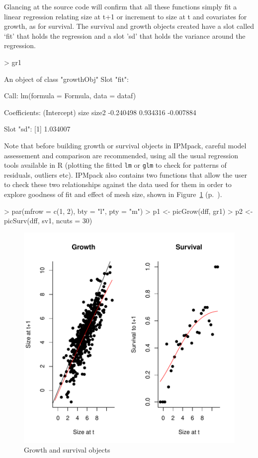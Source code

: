 \documentclass{article}
\begin{document}
Glancing at the source code will confirm that all these functions simply fit a linear regression relating size at t+1 or increment to size at t and covariates for growth, as for survival. The survival and growth objects created have a slot called `fit' that holds the regression and a slot 'sd' that holds the variance around the regression. 
\begin{Schunk}
\begin{Sinput}
> gr1
\end{Sinput}
\begin{Soutput}
An object of class "growthObj"
Slot "fit":

Call:
lm(formula = Formula, data = dataf)

Coefficients:
(Intercept)         size        size2  
  -0.240498     0.934316    -0.007884  


Slot "sd":
[1] 1.034007
\end{Soutput}
\end{Schunk}
Note that before building growth or survival objects in IPMpack, careful model assessement and comparison are recommended, using all the usual regression tools available in R (plotting the fitted {\tt lm} or {\tt glm} to check for patterns of residuals, outliers etc). IPMpack also contains two functions that allow the user to check these two relationships against the data used for them in order to explore goodness of fit and effect of mesh size, shown in Figure~\ref{fig:one} (p.~\pageref{fig:one}).
\begin{Schunk}
\begin{Sinput}
> par(mfrow = c(1, 2), bty = "l", pty = "m")
> p1 <- picGrow(dff, gr1)
> p2 <- picSurv(dff, sv1, ncuts = 30)
\end{Sinput}
\end{Schunk}
\begin{figure}
\begin{center}
\includegraphics{IPMpack_Vignette-fig1}
\end{center}
\caption{Growth and survival objects}
\label{fig:one}
\end{figure}
\end{document}
